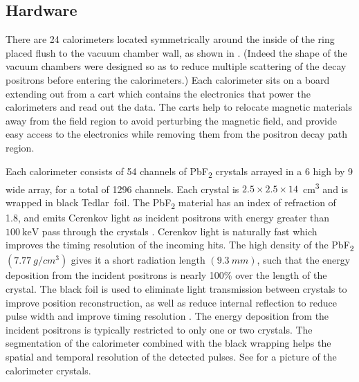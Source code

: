\subsection{Hardware}


There are 24 calorimeters located symmetrically around the inside of the ring placed flush to the vacuum chamber wall, as shown in . (Indeed the shape of the vacuum chambers were designed so as to reduce multiple scattering of the decay positrons before entering the calorimeters.) Each calorimeter sits on a board extending out from a cart which contains the electronics that power the calorimeters and read out the data. The carts help to relocate magnetic materials away from the field region to avoid perturbing the magnetic field, and provide easy access to the electronics while removing them from the positron decay path region.


Each calorimeter consists of 54 channels of PbF\textsubscript{2} crystals arrayed in a 6 high by 9 wide array, for a total of 1296 channels. Each crystal is $2.5 \times 2.5 \times 14$~cm\textsuperscript{3} and is wrapped in black Tedlar\textregistered\ foil. The PbF\textsubscript{2} material has an index of refraction of 1.8, and emits Cerenkov light as incident positrons with energy greater than $\SI{100}{\keV}$ pass through the crystals \cite{Fienberg:2014kka}. Cerenkov light is naturally fast which improves the timing resolution of the incoming hits. The high density of the PbF\textsubscript{2} $(\SI{7.77}{g/cm^{3}})$ gives it a short radiation length $(\SI{9.3}{mm})$, such that the energy deposition from the incident positrons is nearly 100\% over the length of the crystal. The black foil is used to eliminate light transmission between crystals to improve position reconstruction, as well as reduce internal reflection to reduce pulse width and improve timing resolution \cite{Kaspar:2016ofv}. The energy deposition from the incident positrons is typically restricted to only one or two crystals. The segmentation of the calorimeter combined with the black wrapping helps the spatial and temporal resolution of the detected pulses. See  for a picture of the calorimeter crystals.


